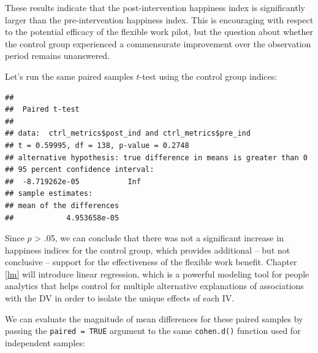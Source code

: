 \documentclass[
]{book}
\newenvironment{Shaded}{\begin{snugshade}}{\end{snugshade}}
\newcommand{\AttributeTok}[1]{\textcolor[rgb]{0.77,0.63,0.00}{#1}}
\newcommand{\CommentTok}[1]{\textcolor[rgb]{0.56,0.35,0.01}{\textit{#1}}}
\newcommand{\ConstantTok}[1]{\textcolor[rgb]{0.00,0.00,0.00}{#1}}
\newcommand{\FunctionTok}[1]{\textcolor[rgb]{0.00,0.00,0.00}{#1}}
\newcommand{\NormalTok}[1]{#1}
\newcommand{\SpecialCharTok}[1]{\textcolor[rgb]{0.00,0.00,0.00}{#1}}
\newcommand{\StringTok}[1]{\textcolor[rgb]{0.31,0.60,0.02}{#1}}
\begin{document}
These results indicate that the post-intervention happiness index is significantly larger than the pre-intervention happiness index. This is encouraging with respect to the potential efficacy of the flexible work pilot, but the question about whether the control group experienced a commensurate improvement over the observation period remains unanswered.

Let's run the same paired samples \(t\)-test using the control group indices:

\begin{Shaded}
\end{Shaded}

\begin{verbatim}
## 
##  Paired t-test
## 
## data:  ctrl_metrics$post_ind and ctrl_metrics$pre_ind
## t = 0.59995, df = 138, p-value = 0.2748
## alternative hypothesis: true difference in means is greater than 0
## 95 percent confidence interval:
##  -8.719262e-05           Inf
## sample estimates:
## mean of the differences 
##            4.953658e-05
\end{verbatim}

Since \(p\) \textgreater{} .05, we can conclude that there was not a significant increase in happiness indices for the control group, which provides additional -- but not conclusive -- support for the effectiveness of the flexible work benefit. Chapter \ref{lm} will introduce linear regression, which is a powerful modeling tool for people analytics that helps control for multiple alternative explanations of associations with the DV in order to isolate the unique effects of each IV.

We can evaluate the magnitude of mean differences for these paired samples by passing the \texttt{paired\ =\ TRUE} argument to the same \texttt{cohen.d()} function used for independent samples:

\begin{Shaded}
\end{Shaded}
\end{document}
